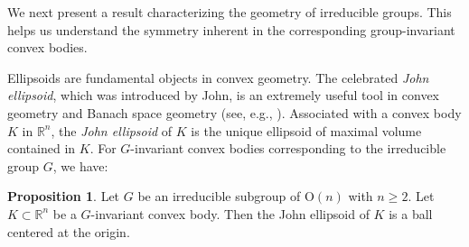 \documentclass[12pt, reqno]{amsart}
\theoremstyle{definition}
\newtheorem{proposition}[theorem]{Proposition}
\theoremstyle{remark}
\numberwithin{equation}{section}
\newcommand{\On}{\mathrm{O}(n)}
\begin{document}
 













	We next present a  result characterizing the geometry of irreducible groups. This helps us understand the symmetry inherent in the corresponding group-invariant convex bodies.





Ellipsoids are fundamental objects in convex geometry.
The
celebrated \textit{John ellipsoid}, which was introduced by John,
is an extremely useful tool in convex geometry and Banach space
geometry (see, e.g., \cite{LYZ2000,LYZ2005}). Associated with a convex body $ K $ in $ \mathbb{R}^{n} $,
the \textit{John ellipsoid} of $ K $ is the unique ellipsoid of
maximal volume contained in $ K $.  For $G$-invariant convex bodies corresponding to the irreducible group $G$, we have:

\begin{proposition}\label{john ellipsoid}
	Let $G $ be an irreducible subgroup of $\On$ with $n\ge 2$. Let $K \subset \mathbb{R}^n$ be a $G$-invariant convex body.  Then the John ellipsoid of $K$  is a ball centered at the origin.
\end{proposition}
\end{document}
